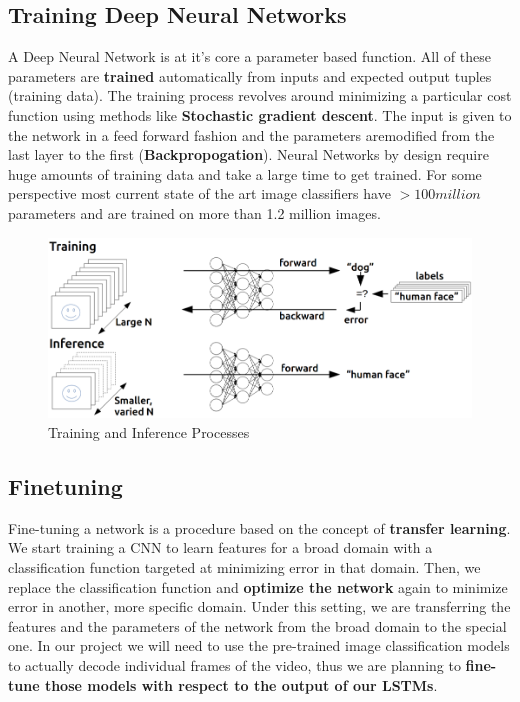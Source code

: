 \documentclass{article}
\begin{document}
			\subsection{Training Deep Neural Networks}
				A Deep Neural Network is at it's core a parameter based function. All of these parameters are  \textbf{trained} automatically from inputs and expected output tuples (training data). The training process revolves around minimizing a particular cost function using methods like \textbf{Stochastic gradient descent}. The input is given to the network in a feed forward fashion and the parameters aremodified from the last layer to the first (\textbf{Backpropogation}). Neural Networks by design require huge amounts of training data and take a large time to get trained. For some perspective most current state of the art image classifiers have $> 100 million$ parameters and are trained on more than 1.2 million images. 
				\begin{figure}[ht!]
					\includegraphics[width=14cm]{training_inference1.png}
					\caption{Training and Inference Processes\label{fig5}}
				\end{figure}

			\subsection{Finetuning}
				Fine-tuning a network is a procedure based on the concept of
				\textbf{transfer learning}. We start training a CNN to learn features for a broad domain with a
				classification function targeted at minimizing error in that domain. Then, we
				replace the classification function and \textbf{optimize the network} again to minimize
				error in another, more specific domain. Under this setting, we are transferring
				the features and the parameters of the network from the broad domain to the
				special one. In our project we will need to use the pre-trained image classification models 
				to actually decode individual frames of the video, thus we are planning to \textbf{fine-tune those models
				with respect to the output of our LSTMs}.
\end{document}
